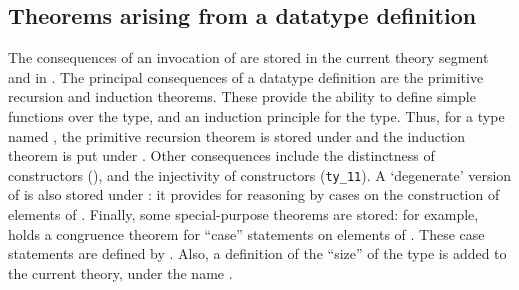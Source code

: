 \subsection{Theorems arising from a datatype definition}

The consequences of an invocation of  are stored in
the current theory segment and in . The principal
consequences of a datatype definition are the primitive recursion and
induction theorems.  These provide the ability to define simple
functions over the type, and an induction principle for the type.
Thus, for a type named , the primitive recursion theorem is
stored under  and the induction theorem is put under
. Other consequences include the distinctness of
constructors (), and the injectivity of constructors
(\verb+ty_11+). A `degenerate' version of  is also
stored under : it provides for reasoning by cases on
the construction of elements of .  Finally, some
special-purpose theorems are stored: for example, 
holds a congruence theorem for ``case'' statements on elements of
. These case statements are defined by .
Also, a definition of the ``size'' of the type is added to the current
theory, under the name .

